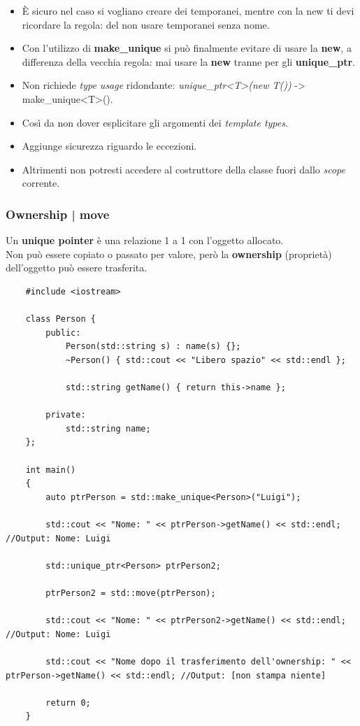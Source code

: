 \begin{itemize}
	\item \textsf{\small È sicuro nel caso si vogliano creare dei temporanei, mentre con la new ti devi ricordare la regola: del non usare temporanei senza nome. } 
	\item \textsf{\small Con l'utilizzo di \textbf{make\_unique} si può finalmente evitare di usare la \textbf{new}, a differenza della vecchia regola: mai usare la \textbf{new} tranne per gli \textbf{unique\_ptr}.} 
	\item \textsf{\small Non richiede \emph{type usage} ridondante: \emph{unique\_ptr<T>(new T())} -> make\_unique<T>().} \\
	\item \textsf{\small Così da non dover esplicitare gli argomenti dei \emph{template types}.}
	\item \textsf{\small Aggiunge sicurezza riguardo le eccezioni.}
	\item \textsf{\small Altrimenti non potresti accedere al costruttore della classe fuori dallo \emph{scope} corrente.}
\end{itemize}

\subsubsection{Ownership | move}

\textsf{\small Un \textbf{unique pointer} è una relazione 1 a 1 con l'oggetto allocato.} \\

\textsf{\small Non può essere copiato o passato per valore, però la \textbf{ownership} (proprietà) dell'oggetto può essere trasferita.} \\

\begin{lstlisting}
	#include <iostream>
	
	class Person {
		public:
			Person(std::string s) : name(s) {};
			~Person() { std::cout << "Libero spazio" << std::endl };
			
			std::string getName() { return this->name };
			
		private:
			std::string name;
	};

	int main()
	{
		auto ptrPerson = std::make_unique<Person>("Luigi");
		
		std::cout << "Nome: " << ptrPerson->getName() << std::endl; //Output: Nome: Luigi
		
		std::unique_ptr<Person> ptrPerson2;
		
		ptrPerson2 = std::move(ptrPerson);
		
		std::cout << "Nome: " << ptrPerson2->getName() << std::endl; //Output: Nome: Luigi
		
		std::cout << "Nome dopo il trasferimento dell'ownership: " << ptrPerson->getName() << std::endl; //Output: [non stampa niente]
		
		return 0;
	}
\end{lstlisting}

